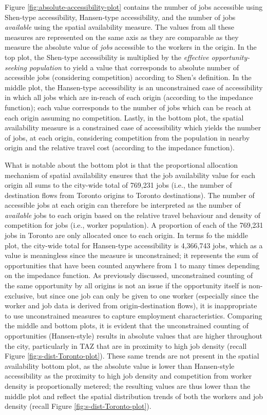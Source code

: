 \documentclass[]{elsarticle} %
\begin{document}
Figure \ref{fig:absolute-accessibility-plot} contains the number of jobs
accessible using Shen-type accessibility, Hansen-type accessibility, and
the number of jobs \emph{available} using the spatial availability
measure. The values from all these measures are represented on the same
axis as they are comparable as they measure the absolute value of
\emph{jobs} accessible to the workers in the origin. In the top plot,
the Shen-type accessibility is multiplied by the \emph{effective
opportunity-seeking population} to yield a value that corresponds to
absolute number of accessible jobs (considering competition) according
to Shen's definition. In the middle plot, the Hansen-type accessibility
is an unconstrained case of accessibility in which all jobs which are
in-reach of each origin (according to the impedance function); each
value corresponds to the number of jobs which can be reach at each
origin assuming no competition. Lastly, in the bottom plot, the spatial
availability measure is a constrained case of accessibility which yields
the number of jobs, at each origin, considering competition from the
population in nearby origin and the relative travel cost (according to
the impedance function).

What is notable about the bottom plot is that the proportional
allocation mechanism of spatial availability ensures that the job
availability value for each origin all sums to the city-wide total of
769,231 jobs (i.e., the number of destination flows from Toronto origins
to Toronto destinations). The number of accessible jobs at each origin
can therefore be interpreted as the number of \emph{available} jobs to
each origin based on the relative travel behaviour and density of
competition for jobs (i.e., worker population). A proportion of each of
the 769,231 jobs in Toronto are only allocated once to each origin. In
terms fo the middle plot, the city-wide total for Hansen-type
accessibility is 4,366,743 jobs, which as a value is meaningless since
the measure is unconstrained; it represents the sum of opportunities
that have been counted anywhere from 1 to many times depending on the
impedance function. As previously discussed, unconstrained counting of
the same opportunity by all origins is not an issue if the opportunity
itself is non-exclusive, but since one job can only be given to one
worker (especially since the worker and job data is derived from
origin-destination flows), it is inappropriate to use unconstrained
measures to capture employment characteristics. Comparing the middle and
bottom plots, it is evident that the unconstrained counting of
opportunities (Hansen-style) results in absolute values that are higher
throughout the city, particularly in TAZ that are in proximity to high
job density (recall Figure \ref{fig:s-dist-Toronto-plot}). These same
trends are not present in the spatial availability bottom plot, as the
absolute value is lower than Hansen-style accessibility as the proximity
to high job density and competition from worker density is
proportionally metered; the resulting values are thus lower than the
middle plot and reflect the spatial distribution trends of both the
workers and job density (recall Figure \ref{fig:s-dist-Toronto-plot}).
\end{document}
